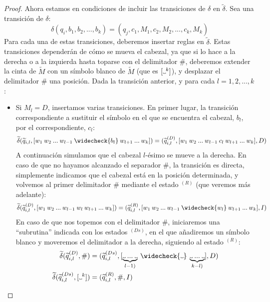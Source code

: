 \begin{proof}
Ahora estamos en condiciones de incluir las transiciones de $\delta$ en $\widetilde{\delta}$. Sea una transición de $\delta$:
$$
    \delta(q_i, b_1, b_2, ..., b_k) = (q_j, c_1, M_1, c_2, M_2, ..., c_k, M_k)
$$
Para cada una de estas transiciones, deberemos insertar reglas en $\widetilde{\delta}$. Estas transiciones dependerán de cómo se mueva el cabezal, ya que si lo hace a la derecha o a la izquierda hasta toparse con el delimitador $\#$, deberemos extender la cinta de $\widetilde{M}$ con un símbolo blanco de $\widetilde{M}$ (que es $[\Vtextvisiblespace^k]$), y desplazar el delimitador $\#$ una posición. Dada la transición anterior, y para cada $l=1, 2, ..., k$:
\begin{itemize}
    \item Si $M_l=D$, insertamos varias transiciones. En primer lugar, la transición correspondiente a sustituir el símbolo en el que se encuentra el cabezal, $b_l$, por el correspondiente, $c_l$:
    \begin{equation}
        \widetilde{\delta}(\widetilde{q}_{i,l}, [w_1\:w_2\:...\:w_{l-1}\:\widecheck{b_l}\:w_{l+1}\:...\:w_k]) = (\widetilde{q}_{i,l}^{(D)}, [w_1\:w_2\:...\:w_{l-1}\:c_l\:w_{l+1}\:...\:w_k], D)
    \end{equation}
    A continuación simulamos que el cabezal $l$-ésimo se mueve a la derecha. En caso de que no hayamos alcanzado el separador $\#$, la transición es directa, simplemente indicamos que el cabezal está en la posición determinada, y volvemos al primer delimitador $\#$ mediante el estado $^{(R)}$ (que veremos más adelante):
    \begin{equation}
        \widetilde{\delta}(\widetilde{q}_{i,l}^{(D)}, [w_1\:w_2\:...\:w_{l-1}\:w_l\:w_{l+1}\:...\:w_k]) = (\widetilde{q}_{i,l}^{(R)}, [w_1\:w_2\:...\:w_{l-1}\:\widecheck{w_l}\:w_{l+1}\:...\:w_k], I)
    \end{equation}
    En caso de que nos topemos con el delimitador $\#$, iniciaremos una ``subrutina'' indicada con los estados $^{(Ds)}$, en el que añadiremos un símbolo blanco y moveremos el delimitador a la derecha, siguiendo al estado $^{(R)}$:
    \begin{align}
        \widetilde{\delta}(\widetilde{q}_{i,l}^{(D)}, \#) &= (\widetilde{q}_{i,l}^{(Ds)}, [\underbrace{{\Vtextvisiblespace} \:... \:{\Vtextvisiblespace}}_{l-1)}\:\widecheck{\Vtextvisiblespace}\:\underbrace{{\Vtextvisiblespace} \:... \:{\Vtextvisiblespace}}_{k-l)}], D)\\
        \widetilde{\delta}(\widetilde{q}_{i,l}^{(Ds)}, [\Vtextvisiblespace^k]) &= (\widetilde{q}_{i,l}^{(R)}, \#, I)\\

\end{align}
\end{itemize}
\end{proof}

